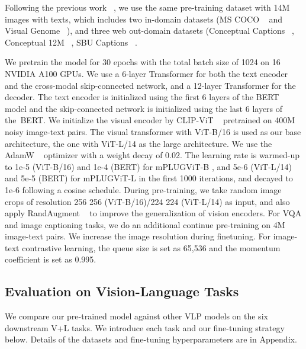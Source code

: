 \documentclass[11pt]{article}
\begin{document}
Following the previous work ~\cite{li2021align}, we use the same pre-training dataset with 14M images with texts, which includes two in-domain datasets (MS COCO ~\cite{lin2014microsoft} and Visual Genome ~\cite{krishna2017visual}), and
three web out-domain datasets (Conceptual Captions ~\cite{sharma2018conceptual}, Conceptual 12M ~\cite{changpinyo2021conceptual}, SBU Captions ~\cite{ordonez2011im2text}. 

We pretrain the model for 30 epochs with the total batch size of 1024 on 16 NVIDIA A100 GPUs. We use a 6-layer Transformer for both the text encoder and the cross-modal skip-connected network, and a 12-layer Transformer for the decoder. The text encoder is initialized using the first 6 layers of the  BERT~\cite{devlin2018bert} model and the skip-connected network is initialized using the last 6 layers of the~BERT. We initialize the visual encoder by CLIP-ViT ~\cite{radford2021learning} pretrained on 400M noisy image-text pairs. The visual transformer with ViT-B/16 is used as our base architecture, the one with ViT-L/14 as the large architecture. We use the AdamW ~\cite{loshchilov2017decoupled} optimizer with a weight decay of 0.02. The learning rate is warmed-up to 1e-5 (ViT-B/16) and 1e-4 (BERT) for mPLUG{\tiny{ViT-B}} , and 5e-6 (ViT-L/14) and 5e-5 (BERT) for mPLUG{\tiny{ViT-L}} in the first 1000 iterations, and decayed to 1e-6 following a cosine schedule. During pre-training, we take random image crops of resolution 256  256 (ViT-B/16)/224  224 (ViT-L/14) as input, and also apply RandAugment ~\cite{cubuk2020randaugment} to improve the generalization of vision encoders. For VQA and image captioning tasks, we do an additional  continue pre-training on 4M image-text pairs.
We increase the image resolution during finetuning. For image-text contrastive learning, the queue size is set as 65,536 and the momentum coefficient is set as 0.995. 
\subsection{Evaluation on Vision-Language Tasks}
We compare our pre-trained model against other VLP models on the six downstream V+L tasks. We introduce each task and our fine-tuning strategy below. 
Details of the datasets and fine-tuning hyperparameters are in Appendix.
\end{document}
